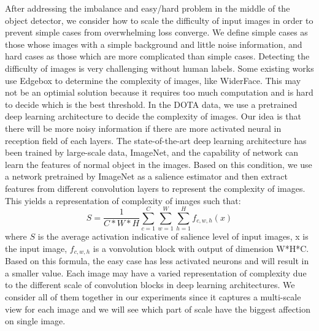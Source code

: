 \documentclass[conference]{IEEEtran}
\begin{document}
    After addressing the imbalance and easy/hard problem in the middle of the object detector, we consider how to scale the difficulty of input images in order to prevent simple cases from overwhelming loss converge. We define simple cases as those whose images with a simple background and little noise information, and hard cases as those which are more complicated than simple cases. Detecting the difficulty of images is very challenging without human labels. Some existing works use Edgebox\cite{zitnick2014edge} to determine the complexity of images, like WiderFace\cite{yang2016wider}. This may not be an optimial solution because it requires too much computation and is hard to decide which is the best threshold. In the DOTA data, we use a pretrained deep learning architecture to decide the complexity of images. Our idea is that there will be more noisy information if there are more activated neural in reception field of each layers. The state-of-the-art deep learning architecture has been trained by large-scale data, ImageNet\cite{deng2009imagenet}, and the capability of network can learn the features of normal object in the images. Based on this condition, we use a network pretrained by ImageNet\cite{deng2009imagenet} as a salience estimator and then extract features from different convolution layers to represent the complexity of images. This yields a representation of complexity of images such that:
	\begin{equation}
		S=\frac{1}{C*W*H}\sum_{c=1}^{C}\sum_{w=1}^{W}\sum_{h=1}^{H}f_{c,w,h}(x)
    \end{equation}	
    where \(S\) is the average activation indicative of salience level of input images, x is the input image, \(f_{c,w,h}\) is a vonvolution block with output of dimension W*H*C. Based on this formula, the easy case has less activated neurons and will result in a smaller value. Each image may have a varied representation of complexity due to the different scale of convolution blocks in deep learning architectures. We consider all of them together in our experiments since it captures a multi-scale view for each image and we will see which part of scale have the biggest affection on single image. 
    
\end{document}
